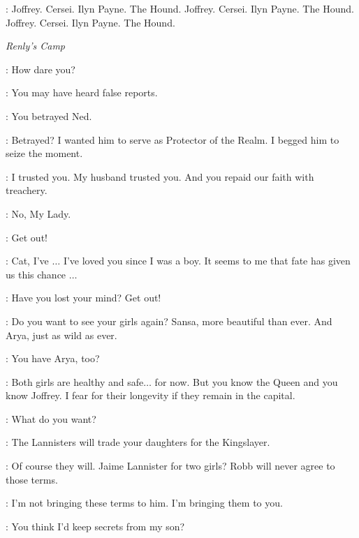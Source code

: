 

\ARYA: Joffrey. Cersei. Ilyn Payne. The Hound. Joffrey. Cersei. Ilyn Payne. The Hound. Joffrey. Cersei. Ilyn Payne. The Hound. 


\scene

\textit{Renly's Camp} 


\CATELYN: How dare you? 

\LITTLEFINGER: You may have heard false reports. 

\CATELYN: You betrayed Ned. 

\LITTLEFINGER: Betrayed? I wanted him to serve as Protector of the Realm. I begged him to seize the moment. 

\CATELYN: I trusted you. My husband trusted you. And you repaid our faith with treachery. 

\LITTLEFINGER: No, My Lady. 

\CATELYN: Get out! 

\LITTLEFINGER: Cat, I've $\ldots$ I've loved you since I was a boy. It seems to me that fate has given us this chance $\ldots$  

\CATELYN: Have you lost your mind? Get out! 


\LITTLEFINGER: Do you want to see your girls again? Sansa, more beautiful than ever. And Arya, just as wild as ever. 

\CATELYN: You have Arya, too? 

\LITTLEFINGER: Both girls are healthy and safe$\ldots$ for now. But you know the Queen and you know Joffrey. I fear for their longevity if they remain in the capital. 


\CATELYN: What do you want? 

\LITTLEFINGER: The Lannisters will trade your daughters for the Kingslayer. 

\CATELYN: Of course they will. Jaime Lannister for two girls? Robb will never agree to those terms. 

\LITTLEFINGER: I'm not bringing these terms to him. I'm bringing them to you. 

\CATELYN: You think I'd keep secrets from my son? 

